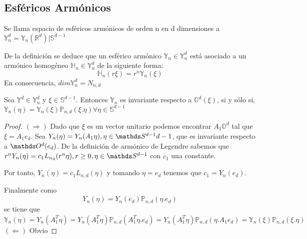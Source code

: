 \subsection{Esféricos Armónicos}
\begin{defn}
Se llama espacio de esféricos armónicos de orden n en d dimensiones a	$\mathds{Y}^d_n = \mathds{Y}_n(\mathds{R}^d)|\mathds{S}^{d-1}$ 
\end{defn}
De la definición se deduce que un esférico armónico $\mathds{Y}_n \in \mathds{Y}^d_n$ está asociado a un armónico homogéneo $\mathds{H}_n \in \mathds{Y}^d_n$ de la siguiente forma:
$$
\mathds{H}_n(r\xi) = r^n\mathds{Y}_n(\xi)
$$
En consecuencia, $dim \mathds{Y}^d_n= N_{n,d}$
\begin{thm}Sea $\mathds{Y}^d \in \mathds{Y}^d_n$ y $\xi\in\mathds{S}^{d-1}$. Entonces $\mathds{Y}_n$ es invariante respecto a $\mathds{O}^d(\xi)$, si y sólo si, $\mathds{Y}_n(\eta)=\mathds{Y}_n(\xi)\mathds{P}_{n,d}(\xi.\eta)    \forall \eta\in\mathds{S}^{d-1}$
\end{thm}
\begin{proof}
$(\Rightarrow)$ Dado que $\xi$ es un vector unitario podemos encontrar $A_1 \mathds{O}^d$ tal que $\xi = A_1e_d$. Sea $\overset{~}{Y_n(\eta)} = Y_n(A_1\eta),\eta\in\sphere{d-1}$, que es invariante respecto a $\orto(e_d)$. De la definición de armónico de Legendre sabemos que $r^n\overset{~}{Y_n(\eta)} = c_1L_{n_d}(r^n\eta), r\ge0, \eta\in\sphere$ con $c_1$ una constante.
\medskip

Por tanto, $\overset{~}{Y_n(\eta)} = c_1 L_{n,d}(\eta)$ y tomando $\eta = e_d$ tenemos que $c_1 = \overset{~}{Y_n(e_d)}$.

\medskip
Finalmente como 
$$
\overset{~}{Y_n(\eta)} = \overset{~}{Y_n(e_d)}\mathds{P}_{n,d}(\eta.e_d)
$$
se tiene que
$$
\mathds{Y}_n(\eta)=\overset{~}{Y_n(A_1^T\eta)}=Y_n(A_1^T\eta)\mathds{P}_{n,d}(A_1^T\eta.e_d)=Y_n(A_1^T\eta)\mathds{P}_{n,d}(\eta.A_1e_d) = \mathds{Y}_n(\xi)\mathds{P}_{n,d}(\xi.\eta)
$$
$(\Leftarrow)$ Obvio
\end{proof}

%	
